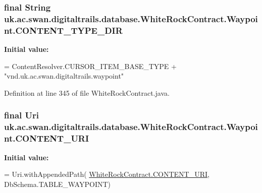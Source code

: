\hypertarget{classuk_1_1ac_1_1swan_1_1digitaltrails_1_1database_1_1_white_rock_contract_1_1_waypoint_a28c77b6244baebc10e1b9a9859bb9623}{
\subsubsection[{C\+O\+N\+T\+E\+N\+T\+\_\+\+T\+Y\+P\+E\+\_\+\+D\+I\+R}]{\setlength{\rightskip}{0pt plus 5cm}final String uk.\+ac.\+swan.\+digitaltrails.\+database.\+White\+Rock\+Contract.\+Waypoint.\+C\+O\+N\+T\+E\+N\+T\+\_\+\+T\+Y\+P\+E\+\_\+\+D\+I\+R\hspace{0.3cm}{\ttfamily [static]}}}\label{classuk_1_1ac_1_1swan_1_1digitaltrails_1_1database_1_1_white_rock_contract_1_1_waypoint_a28c77b6244baebc10e1b9a9859bb9623}
{\bfseries Initial value\+:}
\begin{DoxyCode}
= ContentResolver.CURSOR\_ITEM\_BASE\_TYPE +
                \textcolor{stringliteral}{"vnd.uk.ac.swan.digitaltrails.waypoint"}
\end{DoxyCode}


Definition at line 345 of file White\+Rock\+Contract.\+java.

\hypertarget{classuk_1_1ac_1_1swan_1_1digitaltrails_1_1database_1_1_white_rock_contract_1_1_waypoint_a03d3daf433fe84895c9a47b9da814aff}{
\subsubsection[{C\+O\+N\+T\+E\+N\+T\+\_\+\+U\+R\+I}]{\setlength{\rightskip}{0pt plus 5cm}final Uri uk.\+ac.\+swan.\+digitaltrails.\+database.\+White\+Rock\+Contract.\+Waypoint.\+C\+O\+N\+T\+E\+N\+T\+\_\+\+U\+R\+I\hspace{0.3cm}{\ttfamily [static]}}}\label{classuk_1_1ac_1_1swan_1_1digitaltrails_1_1database_1_1_white_rock_contract_1_1_waypoint_a03d3daf433fe84895c9a47b9da814aff}
{\bfseries Initial value\+:}
\begin{DoxyCode}
= Uri.withAppendedPath(
                \hyperlink{classuk_1_1ac_1_1swan_1_1digitaltrails_1_1database_1_1_white_rock_contract_abfe96759bfe16773a98099536eef2306}{WhiteRockContract.CONTENT\_URI}, DbSchema.TABLE\_WAYPOINT)
\end{DoxyCode}


